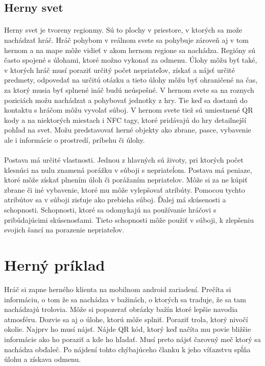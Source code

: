 \subsection{Herny svet}
\paragraph{}
Herny svet je tvoreny regionmy. Sú to plochy v priestore, v ktorých sa može nachádzať hráč. Hráč pohybom v reálnom svete sa pohybuje zároveň aj v tom hernom a na mape môže vidieť v akom hernom regione sa nachádza. Regióny sú často spojené s úlohami, ktoré možno vykonať za odmenu. Úlohy môžu byť také, v ktorých hráč musí poraziť určitý počet nepriateľov, získať a nájsť určité predmety, odpovedať na určitú otázku a tieto úlohy môžu byť ohraničené na čas, za ktorý musia byť splnené ináč budú neúspešné. V hernom svete sa na roznych poziciách možu nachádzat a pohybovať jednotky z hry. Tie keď sa dostanú do kontaktu s hráčom môžu vyvolať súboj. V hernom svete tiež sú umiestnené QR kody a na niektorých miestach i NFC tagy, ktoré pridávajú do hry detailnejší pohľad na svet. Možu predstavovať herné objekty ako zbrane, pasce, vybavenie ale i informácie o prostredí, príbehu či úlohy. 

\paragraph{}
Postava má určité vlastnosti. Jednou z hlavných sú životy, pri ktorých počet klesnúci na nulu znamená porážku v súboji s nepriateĺom. Postava má peniaze, ktoré môže získať plnením úloh či porážaním nepriatelov. Môže si za ne kúpiť zbrane či iné vybavenie, ktoré mu môže vylepšovať atribúty. Pomocou tychto atribútov sa v súboji zisťuje ako prebieha súboj. Ďalej má skúsenosti a schopnosti. Schopnosti, ktoré sa odomykajú na používanie hráčovi s pribúdajúcimi skúsenosťami. Tieto schopnosti môže použiť v súboji, k zlepšeniu svojich šancí na porazenie nepriateľov. 

\section{Herný príklad}
Hráč si zapne herného klienta na mobilnom android zariadení. Prečíta si informáciu, o tom že sa nachádza v bažinách, o ktorých sa traduje, že sa tam nachádzajú trolovia. Môže si popozerať obrázky bažín ktoré lepšie navodia atmosféru. Dozvie sa aj o úlohe, ktorú môže splniť. Poraziť trola, ktorý nivočí okolie. Najprv ho musí nájsť. Nájde QR kód, ktorý keď načíta mu povie bližšie informácie ako ho poraziť a kde ho hľadať. Musí preto nájsť čarovný meč ktorý sa nachádza obďaleč. Po nájdení tohto chýbajúceho članku k jeho víťazstvu spĺňa úlohu a získava odmenu.
